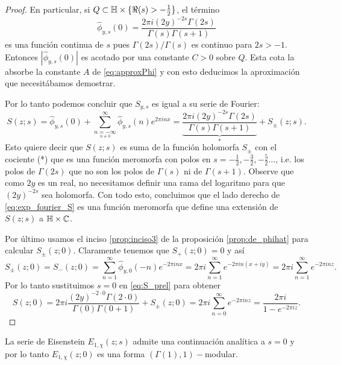 \documentclass[../../tesis_maestria]{subfiles}
\begin{document}
\begin{proof}
  En particular, si $Q\subset\mathbb{H}\times\{\Re(s)>-\tfrac{1}{2}\}$, el t\'ermino
  \[
    \hat{\phi}_{y,s}(0)=\frac{2\pi i(2y)^{-2s}\Gamma(2s)}{\Gamma(s)\Gamma(s+1)}
  \]
  es una funci\'on continua de $s$ pues $\Gamma(2s)/\Gamma(s)$ es continuo para $2s>-1$.
  Entonces $|\hat{\phi}_{y,s}(0)|$ es acotado por una constante $C>0$ sobre $Q$. Esta cota la
  absorbe la constante $A$ de \eqref{eq:approxPhi} y con esto deducimos la
  aproximaci\'on que necesit\'abamos demostrar.

  Por lo tanto podemos concluir que $S_{y,s}$ es igual a su serie de Fourier:
  \begin{equation}\label{eq:S_prel}
    S(z;s)=\hat{\phi}_{y,s}(0)+
    \sum_{\underset{n\neq0}{n=-\infty}}^{\infty}\hat{\phi}_{y,s}(n)e^{2\pi inx}=
    \underset{*}{\underbrace{\frac{2\pi i(2y)^{-2s}\Gamma(2s)}{\Gamma(s)\Gamma(s+1)}}}+S_{\pm}(z;s).
  \end{equation}
  Esto quiere decir que $S(z;s)$ es suma de la funci\'on holomorfa $S_{\pm}$ con el
  cociente (*) que es una funci\'on meromorfa con polos en
  $s=-\tfrac{1}{2},-\tfrac{3}{2},-\tfrac{5}{2}\ldots$, i.e. los polos de $\Gamma(2s)$
  que no son los polos de $\Gamma(s)$ ni de $\Gamma(s+1)$. Observe que como $2y$ es un
  real, no necesitamos definir una rama del logaritmo para que $(2y)^{-2s}$ sea holomorfa.
  Con todo esto, concluimos que el lado derecho de \eqref{eq:exp_fourier_S} es una funci\'on
  meromorfa que define una extensi\'on de $S(z;s)$ a $\mathbb{H}\times\mathbb{C}$.

  Por \'ultimo usamos el inciso \ref{prop:inciso3} de la proposici\'on
  \ref{prop:de_phihat} para calcular $S_{\pm}(z;0)$. Claramente tenemos
  que $S_+(z;0)=0$ y as\'i
  \[
    S_{\pm}(z;0)=
    S_-(z;0)=
    \sum_{n=1}^{\infty}\hat{\phi}_{y,0}(-n)e^{-2\pi inx}=
    2\pi i\sum_{n=1}^{\infty}e^{-2\pi in(x+iy)}=2\pi i\sum_{n=1}^{\infty}e^{-2\pi i nz}.
  \]
  Por lo tanto sustituimos $s=0$ en \eqref{eq:S_prel} para obtener
  \[
    S(z;0)=
    2\pi i\frac{(2y)^{-2\cdot0}\Gamma(2\cdot0)}{\Gamma(0)\Gamma(0+1)}+S_{\pm}(z;0)=
    2\pi i\sum_{n=0}^{\infty}e^{-2\pi i nz}=\frac{2\pi i}{1-e^{-2\pi i z}}.
  \]
\end{proof}






\begin{prop}%
  La serie de Eisenstein $E_{1,\chi}(z;s)$ admite una continuaci\'on anal\'itica a $s=0$ y
  por lo tanto $E_{1,\chi}(z;0)$ es una forma $(\Gamma(1),1)-$modular.
\end{prop}%
\end{document}
